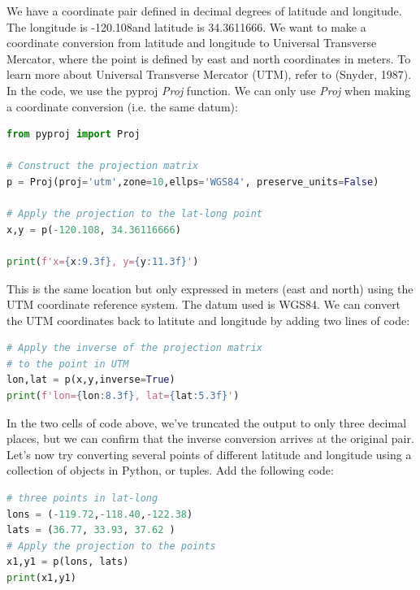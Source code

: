 \documentclass[a4paper , 12pt]{book}
\begin{document}
We have a coordinate pair defined in decimal degrees of latitude and longitude. The longitude is -120.108\degree and latitude is 34.3611666\degree. We want to make a coordinate conversion from latitude and longitude to Universal Transverse Mercator, where the point is defined by east and north coordinates in meters. To learn more about Universal Transverse Mercator (UTM), refer to (Snyder, 1987). In the code, we use the pyproj \textit{Proj} function. We can only use \textit{Proj} when making a coordinate conversion (i.e. the same datum):

\begin{center}
\begin{lstlisting}[language=Python, frame=single]
from pyproj import Proj

# Construct the projection matrix
p = Proj(proj='utm',zone=10,ellps='WGS84', preserve_units=False)

# Apply the projection to the lat-long point
x,y = p(-120.108, 34.36116666)

print(f'x={x:9.3f}, y={y:11.3f}')
\end{lstlisting}
\end{center}

This is the same location but only expressed in meters (east and north) using the UTM coordinate reference system. The datum used is WGS84. We can convert the UTM coordinates back to latitute and longitude by adding two lines of code:

\begin{center}
\begin{lstlisting}[language=Python, frame=single]
# Apply the inverse of the projection matrix
# to the point in UTM
lon,lat = p(x,y,inverse=True)
print(f'lon={lon:8.3f}, lat={lat:5.3f}')
\end{lstlisting}
\end{center}

In the two cells of code above, we’ve truncated the output to only three decimal places, but we can confirm that the inverse conversion arrives at the original pair. Let's now try converting several points of different latitude and longitude using a collection of objects in Python, or tuples. Add the following code:

\begin{center}
\begin{lstlisting}[language=Python, frame=single]
# three points in lat-long
lons = (-119.72,-118.40,-122.38)
lats = (36.77, 33.93, 37.62 )
# Apply the projection to the points
x1,y1 = p(lons, lats)
print(x1,y1)
\end{lstlisting}
\end{center}
\end{document}
